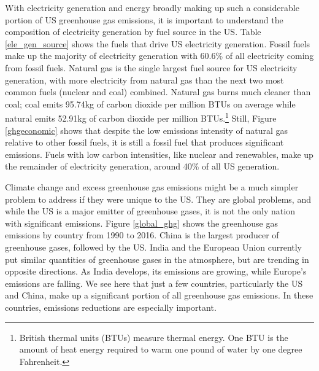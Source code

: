 With electricity generation and energy broadly making up such a considerable portion of US greenhouse gas emissions, it is important to understand the composition of electricity generation by fuel source in the US. Table \ref{ele_gen_source} shows the fuels that drive US electricity generation. Fossil fuels make up the majority of electricity generation with 60.6\% of all electricity coming from fossil fuels. Natural gas is the single largest fuel source for US electricity generation, with more electricity from natural gas than the next two most common fuels (nuclear and coal) combined. Natural gas burns much cleaner than coal; coal emits 95.74kg of carbon dioxide per million BTUs on average while natural emits 52.91kg of carbon dioxide per million BTUs.\footnote{British thermal units (BTUs) measure thermal energy. One BTU is the amount of heat energy required to warm one pound of water by one degree Fahrenheit.} Still, Figure \ref{ghgeconomic} shows that despite the low emissions intensity of natural gas relative to other fossil fuels, it is still a fossil fuel that produces significant emissions. Fuels with low carbon intensities, like nuclear and renewables, make up the remainder of electricity generation, around 40\% of all US generation.

Climate change and excess greenhouse gas emissions might be a much simpler problem to address if they were unique to the US. They are global problems, and while the US is a major emitter of greenhouse gases, it is not the only nation with significant emissions. Figure \ref{global_ghg} shows the greenhouse gas emissions by country from 1990 to 2016. China is the largest producer of greenhouse gases, followed by the US. India and the European Union currently put similar quantities of greenhouse gases in the atmosphere, but are trending in opposite directions. As India develops, its emissions are growing, while Europe's emissions are falling. We see here that just a few countries, particularly the US and China, make up a significant portion of all greenhouse gas emissions. In these countries, emissions reductions are especially important. 

